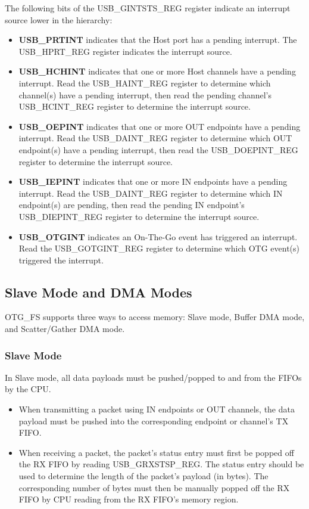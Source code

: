 \documentclass[main\_\_EN.tex]{subfiles}
\begin{document}
The following bits of the USB\_GINTSTS\_REG register indicate an interrupt source lower in the hierarchy:

\begin{itemize}
    \item {\bfseries USB\_PRTINT} indicates that the Host port has a pending interrupt. The USB\_HPRT\_REG register indicates the interrupt source.
    \item {\bfseries USB\_HCHINT} indicates that one or more Host channels have a pending interrupt. Read the USB\_HAINT\_REG register to determine which channel(s) have a pending interrupt, then read the pending channel’s USB\_HCINT\_REG register to determine the interrupt source.
    \item {\bfseries USB\_OEPINT} indicates that one or more OUT endpoints have a pending interrupt. Read the USB\_DAINT\_REG register to determine which OUT endpoint(s) have a pending interrupt, then read the USB\_DOEPINT\_REG register to determine the interrupt source.
    \item {\bfseries USB\_IEPINT} indicates that one or more IN endpoints have a pending interrupt. Read the USB\_DAINT\_REG register to determine which IN endpoint(s) are pending, then read the pending IN endpoint’s USB\_DIEPINT\_REG register to determine the interrupt source.
    \item {\bfseries USB\_OTGINT} indicates an On-The-Go event has triggered an interrupt. Read the USB\_GOTGINT\_REG register to determine which OTG event(s) triggered the interrupt.
\end{itemize}

\subsection{Slave Mode and DMA Modes}

OTG\_FS supports three ways to access memory: Slave mode, Buffer DMA mode, and Scatter/Gather DMA mode.


\subsubsection{Slave Mode}

In Slave mode, all data payloads must be pushed/popped to and from the FIFOs by the CPU.

\begin{itemize}
    \item When transmitting a packet using IN endpoints or OUT channels, the data payload must be pushed into the corresponding endpoint or channel’s TX FIFO.
    \item When receiving a packet, the packet’s status entry must first be popped off the RX FIFO by reading USB\_GRXSTSP\_REG. The status entry should be used to determine the length of the packet’s payload (in bytes). The corresponding number of bytes must then be manually popped off the RX FIFO by CPU reading from the RX FIFO’s memory region.
\end{itemize}
\end{document}
